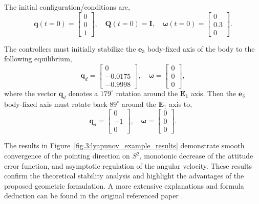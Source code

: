 The initial configuration/conditions are,
\[
\mathbf{q}(t=0) = \begin{bmatrix} 0 \\ 0 \\ 1 \end{bmatrix}, 
\quad \mathbf{Q}(t=0) = \mathbf{I}, 
\quad \boldsymbol{\omega}(t=0) = \begin{bmatrix} 0 \\ 0.3 \\ 0 \end{bmatrix}.
\]

The controllers must initially stabilize the $\mathbf{e}_3$ body-fixed axis of the body to the following equilibrium,
\[
\mathbf{q}_d = \begin{bmatrix} 0 \\ -0.0175 \\ -0.9998 \end{bmatrix}, 
\quad \boldsymbol{\omega} = \begin{bmatrix} 0 \\ 0 \\ 0 \end{bmatrix},
\]
where the vector $\mathbf{q}_d$ denotes a $179^\circ$ rotation around the $\mathbf{E}_1$ axis. Then the $\mathbf{e}_3$ body-fixed axis must rotate back $89^\circ$ around the $\mathbf{E}_1$ axis to,
\[
\mathbf{q}_d = \begin{bmatrix} 0 \\ -1 \\ 0 \end{bmatrix}, 
\quad \boldsymbol{\omega} = \begin{bmatrix} 0 \\ 0 \\ 0 \end{bmatrix}.
\]

The results in Figure~\ref{fig.3:lyapunov_example_results} demonstrate smooth convergence of the pointing direction on \( S^2 \), monotonic decrease of the attitude error function, and asymptotic regulation of the angular velocity. These results confirm the theoretical stability analysis and highlight the advantages of the proposed geometric formulation. A more extensive explanations and formula deduction can be found in the original referenced paper \cite{lyapunov_outer_loop_control}.

